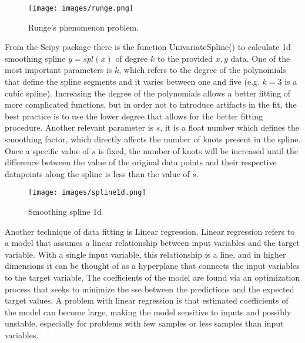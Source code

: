 \begin{figure}[H]
	\centering
	\texttt{[image: images/runge.png]}
	\caption[Runge's phenomenon problem.]{Runge's phenomenon problem.}
	\label{fig:runge}
\end{figure}

\noindent From the Scipy package there is the function UnivariateSpline() to calculate \gls{1d} smoothing spline $y = spl(x)$ of degree $k$ to the provided $x, y$ data. One of the most important parameters is $k$, which refers to the degree of the polynomials that define the spline segments and it varies between one and five (e.g. $k = 3$ is a cubic spline). Increasing the degree of the polynomials allows a better fitting of more complicated functions, but in order not to introduce artifacts in the fit, the best practice is to use the lower degree that allows for the better fitting procedure. Another relevant parameter is $s$, it is a float number which defines the smoothing factor, which directly affects the number of knots present in the spline. Once a specific value of $s$ is fixed, the number of knots will be increased until the difference between the value of the original data points and their respective datapoints along the spline is less than the value of $s$.

\begin{figure}[H]
	\centering
	\texttt{[image: images/spline1d.png]}
	\caption[Smoothing spline 1D.]{Smoothing spline \gls{1d}}
	\label{fig:spline1d}
\end{figure}

\noindent Another technique of data fitting is Linear regression. Linear regression refers to a model that assumes a linear relationship between input variables and the target variable. With a single input variable, this relationship is a line, and in higher dimensions it can be thought of as a hyperplane that connects the input variables to the target variable. The coefficients of the model are found via an optimization process that seeks to minimize the \gls{sse} between the predictions and the expected target values. A problem with linear regression is that estimated coefficients of the model can become large, making the model sensitive to inputs and possibly unstable, especially for problems with few samples or less samples than input variables. \\

